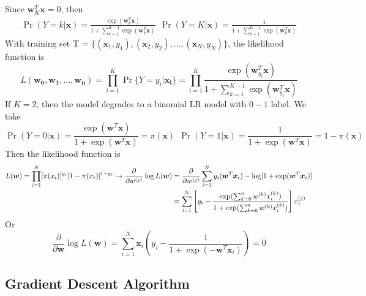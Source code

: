 \documentclass[12pt]{article}
\begin{document}
Since $\bm{w}_{K}^T\bm{x} = 0$, then
\begin{equation}
\begin{aligned}
    \Pr(Y = k|\bm{x}) = \frac{\exp(\bm{w}_k^T\bm{x})}{1+\sum_{k=1}^{K-1}\exp(\bm{w}_k^T \bm{x})}~~
    \Pr(Y = K|\bm{x}) = \frac{1}{1+\sum_{k=1}^{K-1}\exp(\bm{w}_k^T \bm{x})}
\end{aligned}
\end{equation}
With training set T = $\{ (\bm{x}_1, y_1),(\bm{x}_2, y_2), \dots, (\bm{x}_N, y_N)\}$, the likelihood function is
\begin{equation}
    L(\bm{w_0}, \bm{w_1}, \dots, \bm{w_n}) = \prod_{i=1}^K \Pr\{Y = y_i|\bm{x_i} \} = \prod_{i=1}^K \frac{\exp(\bm{w}_{y_i}^T\bm{x})}{1+\sum_{k=1}^{K-1}\exp(\bm{w}_{y_i}^T \bm{x})}
\end{equation}
If $K = 2$, then the model degrades to a binomial LR model with $0-1$ label. We take
\begin{equation}
    \Pr(Y = 0|\bm{x}) = \frac{\exp(\bm{w}^T\bm{x})}{1+\exp(\bm{w}^T \bm{x})} = \pi(\bm{x})~~
    \Pr(Y = 1|\bm{x}) = \frac{1}{1+\exp(\bm{w}^T \bm{x})} = 1- \pi(\bm{x})
\end{equation}
Then the likelihood function is
\begin{equation}
\begin{aligned}
    L(\bm{w}) = \prod_{i=1}^N [\pi(x_i)]^{y_i}[1-\pi(x_i)]^{1-y_i} \rightarrow \frac{\partial}{\partial w^{(j)}} \log L(\bm{w}) &= \frac{\partial}{\partial w^{(j)}} \sum_{i=1}^N y_i(\bm{w}^T \bm{x}_i) - \log[1 + \exp(\bm{w}^T \bm{x}_i)]\\
    &= \sum_{i=1}^N \left[ y_i - \frac{\exp(\sum_{k=0}^n w^{(k)}x_i^{(k)})}{1+\exp(\sum_{k=0}^n w^{(k)}x_i^{(k)})}\right] x_i^{(j)} \notag
\end{aligned}
\end{equation}
Or
\begin{equation}
    \label{maxima}
    \frac{\partial}{\partial \bm{w}} \log L(\bm{w}) = \sum_{i=1}^N \bm{x}_i \left(y_i - \frac{1}{1 + \exp(-\bm{w}^T\bm{x}_i)} \right) = 0
\end{equation}
\subsection{Gradient Descent Algorithm}
\end{document}
